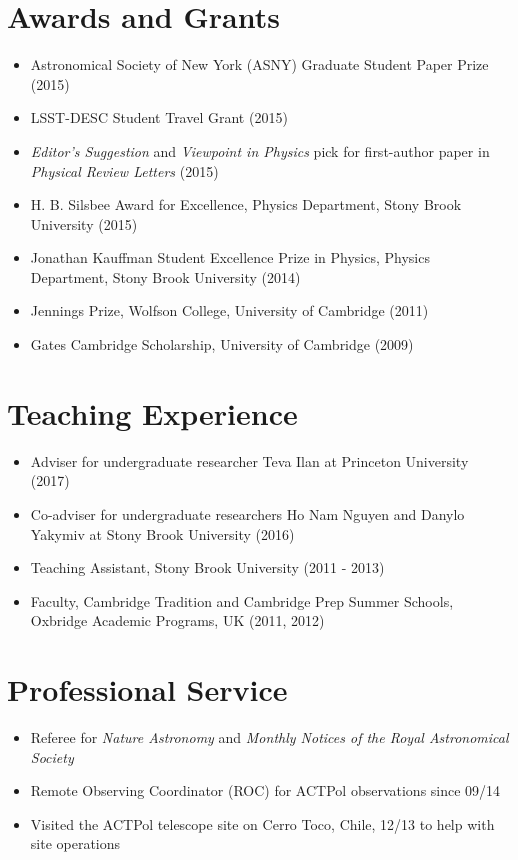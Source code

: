 \documentclass[10pt,margin]{res}
\begin{document}
\begin{resume}
\section{Awards and Grants}
\par
\begin{itemize}
\item Astronomical Society of New York (ASNY) Graduate Student Paper Prize (2015)
\item LSST-DESC Student Travel Grant (2015)
\item {\sl Editor's Suggestion} and {\sl Viewpoint in Physics} pick for first-author paper in {\sl Physical Review Letters} (2015)
\item H. B. Silsbee Award for Excellence, Physics Department, Stony Brook University (2015)
\item Jonathan Kauffman Student Excellence Prize in Physics, Physics Department, Stony Brook University (2014)
\item Jennings Prize, Wolfson College, University of Cambridge (2011)
\item Gates Cambridge Scholarship, University of Cambridge (2009) %
\end{itemize}

\section{Teaching Experience}
\begin{itemize}
\item Adviser for undergraduate researcher Teva Ilan at Princeton University (2017)
\item Co-adviser for undergraduate researchers Ho Nam Nguyen and Danylo Yakymiv at Stony Brook University (2016)
\item Teaching Assistant, Stony Brook University (2011 - 2013)
\item Faculty, Cambridge Tradition and Cambridge Prep Summer Schools, Oxbridge Academic Programs, UK (2011, 2012)
\end{itemize}

\section{Professional Service}
\begin{itemize}
\item Referee for {\sl Nature Astronomy} and {\sl Monthly Notices of the Royal Astronomical Society}
\item Remote Observing Coordinator (ROC) for ACTPol observations since 09/14
\item Visited the ACTPol telescope site on Cerro Toco, Chile, 12/13 to help with site operations
\end{itemize}


\end{resume}
\end{document}
